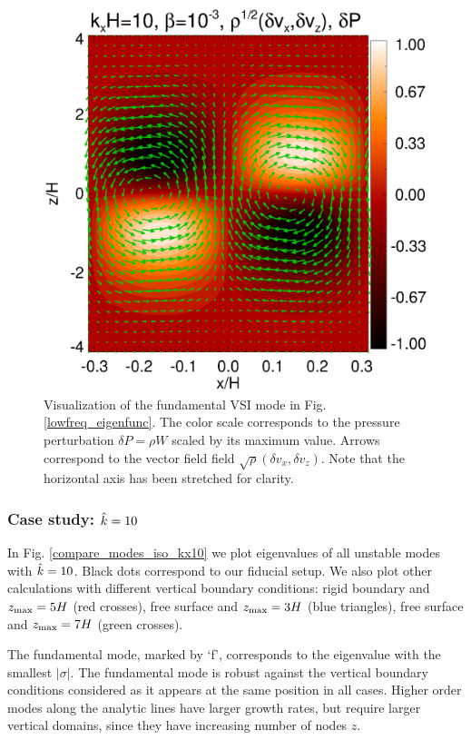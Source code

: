 \begin{figure}
  \includegraphics[width=\linewidth]{figures/result2d_iso}
  \caption{Visualization of the fundamental VSI mode in
    Fig. \ref{lowfreq_eigenfunc}. The color scale corresponds to the
    pressure perturbation $\delta P=\rho W$ scaled by its maximum value.
    Arrows correspond to the vector field field $\sqrt{\rho}(\delta
    v_x,\delta v_z)$. Note that the horizontal axis has been stretched 
    for clarity.  
    \label{lowfreq_eigenfunc_2d}
  }
\end{figure}


\subsubsection{Case study: $\hat{k}=10$}
In Fig. \ref{compare_modes_iso_kx10} we plot eigenvalues of all unstable 
modes with $\hat{k}=10$. Black dots correspond to our fiducial setup. 
We also plot other calculations with different
vertical boundary conditions: rigid boundary and $z_\mathrm{max}=5H$ (red
crosses),  free surface and $z_\mathrm{max} = 3H$ (blue triangles), free surface
and $z_\mathrm{max}=7H$ (green crosses). 

The fundamental mode, marked by `f', corresponds to the eigenvalue
with the smallest $|\sigma|$. The fundamental mode is
robust against the vertical boundary conditions considered as it
appears at the same position in all cases. Higher order modes along
the analytic lines have larger growth rates, but require larger
vertical domains, since they have increasing number of nodes  $z$.  

